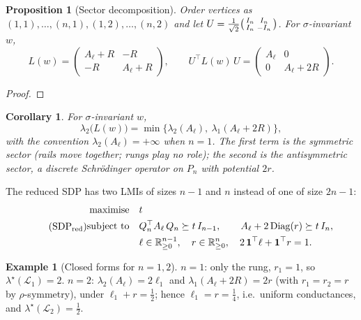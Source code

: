 \documentclass[11pt,a4paper]{article}
\newif\ifdraftnotes
\newcommand{\todo}[1]{\ifdraftnotes{\color{red!70!black}\sffamily[TODO: #1]}\fi}
\theoremstyle{plain}
\newtheorem{proposition}[theorem]{Proposition}
\newtheorem{corollary}[theorem]{Corollary}
\theoremstyle{definition}
\newtheorem{example}[theorem]{Example}
\theoremstyle{remark}
\newcommand{\R}{\mathbb{R}}
\newcommand{\one}{\mathbf{1}}
\newcommand{\Lad}{\mathcal{L}}            %
\newcommand{\opt}{\lambda^{\star}}        %
\DeclareMathOperator{\Diag}{Diag}
\begin{document}
	\begin{proposition}[Sector decomposition]\label{prop:sectors}
		Order vertices as $(1,1),\dots,(n,1),(1,2),\dots,(n,2)$ and let
		$U=\frac1{\sqrt2}\begin{psmallmatrix}I_n&I_n\\I_n&-I_n\end{psmallmatrix}$.
		For $\sigma$-invariant $w$,
		\[
		L(w)=\begin{pmatrix}A_\ell+R & -R\\ -R & A_\ell+R\end{pmatrix},
		\qquad
		U^\top L(w)\,U=\begin{pmatrix}A_\ell & 0\\ 0 & A_\ell+2R\end{pmatrix}.
		\]
	\end{proposition}
	\begin{proof}\todo{Direct block multiplication.}\end{proof}
	
	\begin{corollary}\label{cor:sectors}
		For $\sigma$-invariant $w$,
		\[
		\lambda_2\bigl(L(w)\bigr)
		=\min\bigl\{\lambda_2(A_\ell),\ \lambda_1(A_\ell+2R)\bigr\},
		\]
		with the convention $\lambda_2(A_\ell)=+\infty$ when $n=1$. The first
		term is the \emph{symmetric sector} (rails move together; rungs play no
		role); the second is the \emph{antisymmetric sector}, a discrete
		Schr\"odinger operator on $P_n$ with potential $2r$.
	\end{corollary}
	
	The reduced SDP has two LMIs of sizes $n-1$ and $n$ instead of one of size
	$2n-1$:
	\begin{equation}\label{eq:sdpred}\tag{SDP$_{\mathrm{red}}$}
		\begin{aligned}
			\text{maximise}\quad & t\\
			\text{subject to}\quad & Q_n^\top A_\ell\,Q_n\succeq t\,I_{n-1},\qquad
			A_\ell+2\Diag(r)\succeq t\,I_n,\\
			& \ell\in\R^{n-1}_{\ge0},\quad r\in\R^n_{\ge0},\quad
			2\,\one^\top\ell+\one^\top r=1 .
		\end{aligned}
	\end{equation}
	
	\begin{example}[Closed forms for $n=1,2$]\label{ex:small}
		$n=1$: only the rung, $r_1=1$, so $\opt(\Lad_1)=2$.
		$n=2$: $\lambda_2(A_\ell)=2\ell_1$ and $\lambda_1(A_\ell+2R)=2r$ (with
		$r_1=r_2=r$ by $\rho$-symmetry), under $\ell_1+r=\tfrac12$; hence
		$\ell_1=r=\tfrac14$, i.e.\ uniform conductances, and $\opt(\Lad_2)=\tfrac12$.
	\end{example}
	
\end{document}
